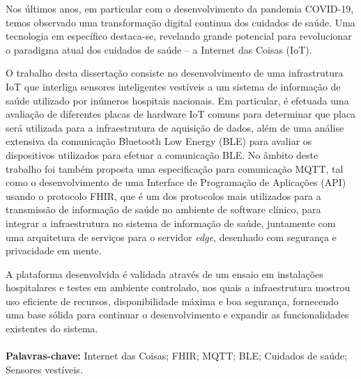\vspace{1cm}
\noindent

Nos últimos anos, em particular com o desenvolvimento da pandemia COVID-19, temos observado uma transformação digital continua dos cuidados de saúde. Uma tecnologia em específico destaca-se, revelando grande potencial para revolucionar o paradigma atual dos cuidados de saúde -- a Internet das Coisas (\acs{IoT}).

O trabalho desta dissertação consiste no desenvolvimento de uma infrastrutura \acs{IoT} que interliga sensores inteligentes vestíveis a um sistema de informação de saúde utilizado por inúmeros hospitais nacionais. 
Em particular, é efetuada uma avaliação de diferentes placas de hardware \acs{IoT} comuns para determinar que placa será utilizada para a infraestrutura de aquisição de dados, além de uma análise extensiva da comunicação Bluetooth Low Energy (\acs{BLE}) para avaliar os dispositivos utilizados para efetuar a comunicação \acs{BLE}.
No âmbito deste trabalho foi também proposta uma especificação para comunicação \acf{MQTT}, tal como o desenvolvimento de uma Interface de Programação de Aplicações (\acs{API}) usando o protocolo \acf{FHIR}, que é um dos protocolos mais utilizados para a transmissão de informação de saúde no ambiente de software clínico, para integrar a infraestrutura no sistema de informação de saúde, juntamente com uma arquitetura de serviços para o servidor \textit{edge}, desenhado com segurança e privacidade em mente.

A plataforma desenvolvida é validada através de um ensaio em instalações hospitalares e testes em ambiente controlado, nos quais a infraestrutura mostrou uso eficiente de recursos, disponibilidade máxima e boa segurança, fornecendo uma base sólida para continuar o desenvolvimento e expandir as funcionalidades existentes do sistema.

\paragraph{}\textbf{Palavras-chave:} Internet das Coisas; \acs{FHIR}; \acs{MQTT}; \acl{BLE}; Cuidados de saúde; Sensores vestíveis.
